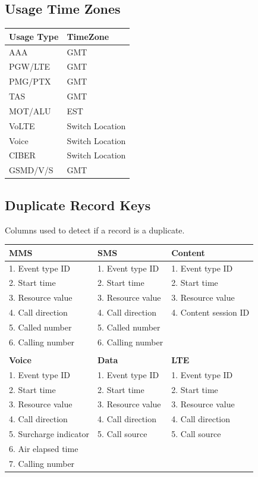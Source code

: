 \documentclass[12pt,twoside]{article}
\begin{document}
\subsection{Usage Time Zones}
\label{sec:orgheadline19}
\begin{center}
\begin{tabular}{ll}
\hline
\textbf{Usage Type} & \textbf{TimeZone}\\
\hline
AAA & GMT\\
PGW/LTE & GMT\\
PMG/PTX & GMT\\
TAS & GMT\\
MOT/ALU & EST\\
VoLTE & Switch Location\\
Voice & Switch Location\\
CIBER & Switch Location\\
GSMD/V/S & GMT\\
\hline
\end{tabular}
\end{center}

\subsection{Duplicate Record Keys}
\label{sec:orgheadline20}
Columns used to detect if a record is a duplicate.
\small
\begin{center}
\begin{tabular}{lll}
\hline
\textbf{MMS} & \textbf{SMS} & \textbf{Content}\\
\hline
1. Event type ID & 1. Event type ID & 1. Event type ID\\
2. Start time & 2. Start time & 2. Start time\\
3. Resource value & 3. Resource value & 3. Resource value\\
4. Call direction & 4. Call direction & 4. Content session ID\\
5. Called number & 5. Called number & \\
6. Calling number & 6. Calling number & \\
 &  & \\
\hline
\textbf{Voice} & \textbf{Data} & \textbf{LTE}\\
\hline
1. Event type ID & 1. Event type ID & 1. Event type ID\\
2. Start time & 2. Start time & 2. Start time\\
3. Resource value & 3. Resource value & 3. Resource value\\
4. Call direction & 4. Call direction & 4. Call direction\\
5. Surcharge indicator & 5. Call source & 5. Call source\\
6. Air elapsed time &  & \\
7. Calling number &  & \\
\hline
\end{tabular}
\end{center}
\end{document}
